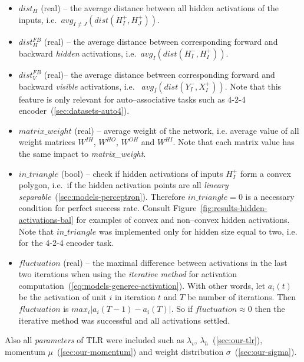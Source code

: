 \begin{itemize} 
\label{sec:our-h-dist} 
\item $dist_{H}$ (real) -- the average distance between all hidden activations of the inputs, i.e.~$avg_{I \neq J}\left(dist(H_I^{+},H_J^{+})\right)$. %

\label{sec:our-dist-h-fb}
\item $dist_{H}^{FB}$ (real) -- the average distance between corresponding forward and backward \emph{hidden} activations, i.e.~$avg_{I}\left(dist(H_I^{-},H_I^{+})\right)$.

\label{sec:our-dist-o-fb}
\item	$dist_{V}^{FB}$ (real)-- the average distance between corresponding forward and backward \emph{visible} activations, i.e.~  $avg_{I}\left(dist(Y_I^{-},X_I^{+})\right)$. Note that this feature is only relevant for auto--associative tasks such as 4-2-4 encoder~(\ref{sec:datasets-auto4}). 

\label{sec:our-m-wei}
\item $matrix\_weight$ (real) -- average weight of the network, i.e. average value of all weight matrices $W^{IH}$, $W^{HO}$, $W^{OH}$ and $W^{HI}$. Note that each matrix value has the same impact to \emph{matrix\_weight}. 

\label{sec:our-in-triangle}
\item $in\_triangle$ (bool) -- check if hidden activations of inputs  $H_I^{+}$ form a convex polygon, i.e.~if the hidden activation points are all \emph{lineary separable}~(\ref{sec:models-perceptron}). Therefore $in\_triangle=0$ is a necessary condition for perfect success rate. Consult Figure~\ref{fig:results-hidden-activations-bal} for examples of convex and non--convex hidden activations. Note that $in\_triangle$ was implemented only for hidden size equal to two, i.e. for the 4-2-4 encoder task. 

\label{sec:our-fluctuation}
\item $fluctuation$ (real) -- the maximal difference between activations in the last two iterations when using the \emph{iterative method} for activation computation~(\ref{eq:models-generec-activation}). With other words, let $a_i(t)$ be the activation of unit $i$ in iteration $t$ and $T$ be number of iterations. Then $fluctuation$ is $max_i|a_i(T-1) - a_i(T)|$. So if $fluctuation \approx 0$ then the iterative method was successful and all activations settled.
\end{itemize} 

Also all \emph{parameters} of TLR were included such as $\lambda_v$, $\lambda_h$~(\ref{sec:our-tlr}), momentum $\mu$~(\ref{sec:our-momentum}) and weight distribution $\sigma$~(\ref{sec:our-sigma}). 

